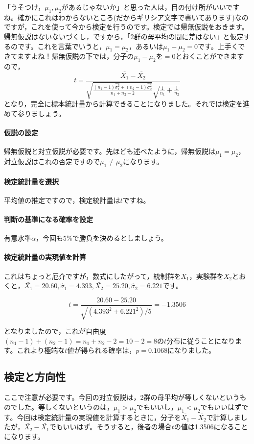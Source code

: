 \documentclass{ltjsbook}
\begin{document}
「うそつけ，$\mu_1,\mu_2$があるじゃないか」と思った人は，目の付け所がいいですね。確かにこれはわからないところ(だからギリシア文字で書いてあります)なのですが，これを使って今から検定を行うのです。検定では帰無仮説をおきます。帰無仮説はないないづくし，ですから，「2群の母平均の間に差はない」と仮定するのです。これを言葉でいうと，$\mu_1=\mu_2$，あるいは$\mu_1-\mu_2=0$です。上手くできてますよね！帰無仮説の下では，分子の$\mu_1-\mu_2$を$=0$とおくことができますので，
\[ t = \frac{\bar{X_1}-\bar{X_2}}{\sqrt{\frac{(n_1-1)\hat{\sigma_1^2}+(n_2-1)\hat{\sigma_2^2}}{n_1+n_2 - 2}}\sqrt{\frac{1}{n_1}+\frac{1}{n_2}}}\]
となり，完全に標本統計量から計算できることになりました。それでは検定を進めて参りましょう。
\paragraph{仮説の設定}帰無仮説と対立仮説が必要です。先ほども述べたように，帰無仮説は$\mu_1=\mu_2$，対立仮説はこれの否定ですので$\mu_1 \neq \mu_2$になります。
\paragraph{検定統計量を選択}平均値の推定ですので，検定統計量は$t$ですね。
\paragraph{判断の基準になる確率を設定}有意水準$\alpha$，今回も5\%で勝負を決めるとしましょう。
\paragraph{検定統計量の実現値を計算}これはちょっと厄介ですが，数式にしたがって，統制群を$X_1$，実験群を$X_2$とおくと，$\bar{X_1}=20.60,\hat{\sigma}_1=4.393,\bar{X_2}=25.20,\hat{\sigma}_2=6.221$です。

\[ t = \frac{20.60-25.20}{\sqrt{(4.393^2+6.221^2)/5}} = -1.3506\]

となりましたので，これが自由度$(n_1-1)+(n_2-1)=n_1+n_2-2=10-2=8$の$t$分布に従うことになります。これより極端な$t$値が得られる確率は，$p=0.1068$になりました。
\subsection{検定と方向性}
ここで注意が必要です。今回の対立仮説は，2群の母平均が等しくないというものでした。等しくないというのは，$\mu_1>\mu_2$でもいいし，$\mu_1<\mu_2$でもいいはずです。今回は検定統計量の実現値を計算するときに，分子を$\bar{X_1}-\bar{X_2}$で計算しましたが，$\bar{X_2}-\bar{X_1}$でもいいはず。そうすると，後者の場合$t$の値は1.3506になることになります。
\end{document}
